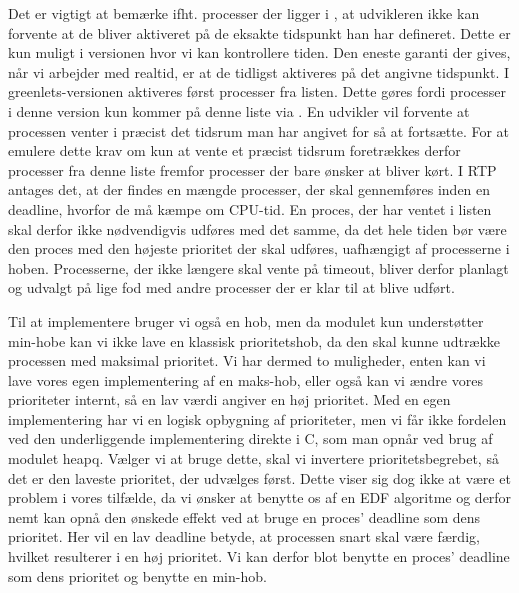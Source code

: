 Det er vigtigt at bemærke ifht. processer der ligger i , at udvikleren ikke kan forvente at de bliver aktiveret på de eksakte tidspunkt han har defineret. Dette er kun muligt i \des versionen hvor vi kan kontrollere tiden. Den eneste garanti der gives, når vi arbejder med realtid, er at de tidligst aktiveres på det angivne tidspunkt. I greenlets-versionen  aktiveres først processer fra  listen. Dette gøres fordi processer i denne version kun kommer på denne liste via . En udvikler vil forvente  at processen venter i præcist det tidsrum man har angivet for så at fortsætte. For at emulere dette krav om kun at vente et præcist tidsrum foretrækkes derfor processer fra denne liste fremfor processer der bare ønsker at bliver kørt. I RTP antages det, at der findes en mængde processer, der skal gennemføres inden en deadline, hvorfor de må kæmpe om CPU-tid. En proces, der har ventet i  listen skal derfor ikke nødvendigvis udføres med det samme, da det hele tiden bør være den proces med den højeste prioritet der skal udføres, uafhængigt af processerne i  hoben. Processerne, der ikke længere skal vente på timeout, bliver derfor planlagt og udvalgt på lige fod med andre processer der er klar til at blive udført. 

Til at implementere  bruger vi også en hob, men da modulet  kun understøtter min-hobe kan vi ikke lave en klassisk prioritetshob, da den skal kunne udtrække processen med maksimal prioritet. Vi har dermed to muligheder, enten kan vi lave vores egen implementering af en maks-hob, eller også kan vi ændre vores prioriteter internt, så en lav værdi angiver en høj prioritet. Med en egen implementering har vi en  logisk opbygning af prioriteter, men vi får ikke fordelen ved den underliggende implementering  direkte i C, som man opnår ved brug af modulet heapq. Vælger vi at bruge dette, skal vi invertere prioritetsbegrebet, så det er den laveste prioritet, der udvælges først. Dette viser  sig dog ikke at være et problem  i vores tilfælde, da vi ønsker at benytte os af en EDF algoritme og derfor nemt kan opnå den ønskede effekt ved at bruge en proces' deadline som dens prioritet. Her vil en lav deadline betyde, at processen snart skal være færdig, hvilket resulterer i en høj prioritet.
Vi kan derfor blot benytte en proces' deadline som dens prioritet og benytte en min-hob. 


